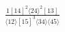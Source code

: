\documentclass[varwidth, border=5pt]{standalone}
\begin{document}
\begin{my}
$\begin{gathered}
\scriptscriptstyle\frac{1[14]^2⟨24⟩^2[13]}{⟨12⟩[15]^3⟨34⟩⟨45⟩}
\end{gathered}$
\end{my}
\end{document}
